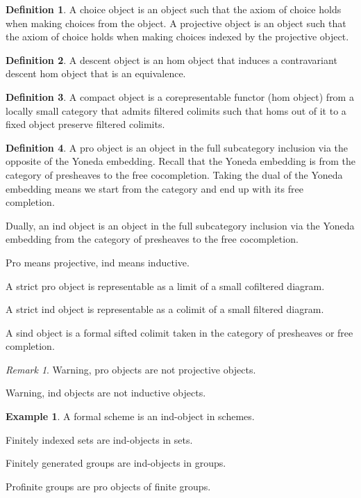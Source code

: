 \documentclass[10pt]{article}
\theoremstyle{plain}%
\theoremstyle{definition}
\newtheorem{definition}{Definition}[section]
\newtheorem{example}{Example}[section]
\theoremstyle{remark}
\newtheorem*{remark}{Remark}
\begin{document}
\begin{definition}
    A choice object is an object such that the axiom of choice holds when making choices from the object. A projective object is an object such that the axiom of choice holds when making choices indexed by the projective object.
\end{definition}

\begin{definition}
    A descent object is an hom object that induces a contravariant descent hom object that is an equivalence.
\end{definition}

\begin{definition}
    A compact object is a corepresentable functor (hom object) from a locally small category that admits filtered colimits such that homs out of it to a fixed object preserve filtered colimits.
\end{definition}

\begin{definition}
    A pro object is an object in the full subcategory inclusion via the opposite of the Yoneda embedding. Recall that the Yoneda embedding is from the category of presheaves to the free cocompletion. Taking the dual of the Yoneda embedding means we start from the category and end up with its free completion.

    Dually, an ind object is an object in the full subcategory inclusion via the Yoneda embedding from the category of presheaves to the free cocompletion.

    Pro means projective, ind means inductive.

    A strict pro object is representable as a limit of a small cofiltered diagram.

    A strict ind object is representable as a colimit of a small filtered diagram.

    A sind object is a formal sifted colimit taken in the category of presheaves or free completion.
\end{definition}

\begin{remark}
    Warning, pro objects are not projective objects.

    Warning, ind objects are not inductive objects.
\end{remark}

\begin{example}
    A formal scheme is an ind-object in schemes.

    Finitely indexed sets are ind-objects in sets.

    Finitely generated groups are ind-objects in groups.

    Profinite groups are pro objects of finite groups.
\end{example}
\end{document}
